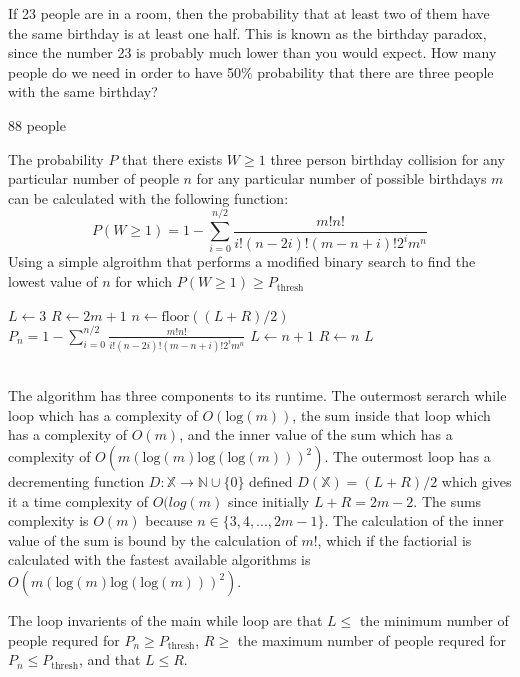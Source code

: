\documentclass{article}
\author{Group: 7 Names: Peter Gifford, Kyle Brekke, Madison Henson, Ren Wall}
\date{due: 18 October 2019}
\newcommand{\N}{\mathbb{N}}
\begin{document}
\nextprob
If 23 people are in a room, then the probability that at least two of them have
the same birthday is at least one half.  This is known as the birthday paradox,
since the number 23 is probably much lower than you would expect.  How many
people do we need in order to have 50\% probability that there are three people
with the same birthday?

88 people

The probability $P$ that there exists $W \geq 1$ three person birthday collision for any particular number of people $n$ for any particular number of possible birthdays $m$ can be calculated with the following function:
$$P(W \geq 1) = 1 - \sum^{n/2}_{i=0} \frac{m!n!}{i!(n-2i)!(m-n+i)!2^i m^n }$$
Using a simple algroithm that performs a modified binary search to find the lowest value of $n$ for which    $P(W \geq 1) \geq  P_{\text{thresh}}$
    \begin{algorithm}
    \begin{algorithmic}
		\State $L \gets 3$		
		\State $R \gets 2m+1$
			\State $n \gets \text{floor}((L + R) / 2)$
			\State $\displaystyle P_n = 1 - \sum^{n/2}_{i=0} \frac{m!n!}{i!(n-2i)!(m-n+i)!2^i m^n }$
				\State	$L \gets n + 1$
				\State $R \gets n$
			\EndIf
		\EndWhile
		\State\Return $L$
	\EndProcedure
	\end{algorithmic}
    \end{algorithm}\\
The algorithm has three components to its runtime. The outermost serarch while loop which has a complexity of $O(\text{log}(m))$, the sum inside that loop which has a complexity of $O(m)$, and the inner value of the sum which has a complexity of $O(m(\text{log}(m)\text{log}(\text{log}(m)))^2 )$. The outermost loop has a decrementing function $D \colon \mathbb{X} \to \N \cup \{0\}$ defined $D( \mathbb{X}) = (L+R)/2 $ which gives it a time complexity of $O(log(m)$ since initially $L + R = 2m - 2$. The sums complexity is $O(m)$ because $n \in \{3,4,...,2m-1\}$. The calculation of the inner value of the sum is bound by the calculation of $m!$, which if the factiorial is calculated with the fastest available algorithms is $O(m(\text{log}(m)\text{log}(\text{log}(m)))^2 )$.

The loop invarients of the main while loop are that $L \leq $ the minimum number of people requred for $P_n \geq P_{\text{thresh}}$, $R \geq $ the maximum number of people requred for $P_n \leq P_{\text{thresh}}$, and that $L \leq R$.
\end{document}
